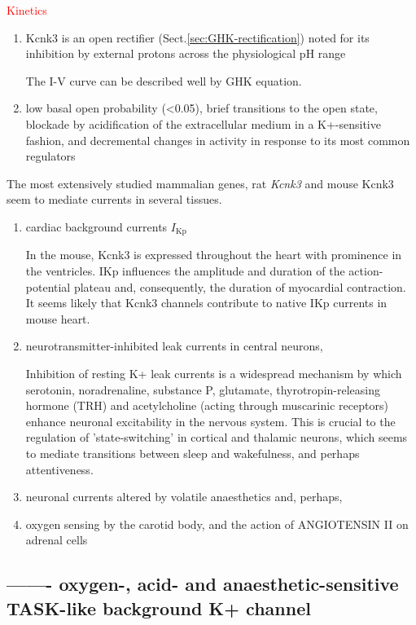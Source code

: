 \textcolor{red}{Kinetics}
\begin{enumerate}
  \item  Kcnk3 is an open rectifier (Sect.\ref{sec:GHK-rectification}) noted for
  its inhibition by external protons across the physiological pH range

The I-V curve can be described well by GHK equation.
  
  
  \item low basal open probability (<0.05), brief transitions to the open state,
  blockade by acidification of the extracellular medium in a K+-sensitive
  fashion, and decremental changes in activity in response to its most common
  regulators 
  
\end{enumerate}

The most extensively studied mammalian genes, rat {\it Kcnk3} and mouse Kcnk3
seem to mediate currents in several tissues.
\begin{enumerate}
  \item  cardiac background currents $I_{\text{Kp}}$

In the mouse, Kcnk3 is expressed throughout the heart with prominence in the
ventricles. IKp influences the amplitude and duration of the action-potential
plateau and, consequently, the duration of myocardial contraction.
It seems likely that Kcnk3 channels contribute to native IKp currents in mouse
heart.
  
  \item neurotransmitter-inhibited leak currents in central neurons, 
  
Inhibition of resting K+ leak currents is a widespread mechanism by which
serotonin, noradrenaline, substance P, glutamate, thyrotropin-releasing hormone
(TRH) and acetylcholine (acting through muscarinic receptors) enhance neuronal
excitability in the nervous system. This is
crucial to the regulation of 'state-switching' in cortical
and thalamic neurons, which seems to mediate transitions
between sleep and wakefulness, and perhaps attentiveness.

  
  \item neuronal currents altered by volatile anaesthetics and, perhaps,
  
  \item oxygen sensing by the carotid body, and the action of ANGIOTENSIN II on
  adrenal cells
\end{enumerate}



\subsection{------- oxygen-, acid- and anaesthetic-sensitive TASK-like
background K+ channel}
\label{sec:oxygen-sensitive-background-K+}

